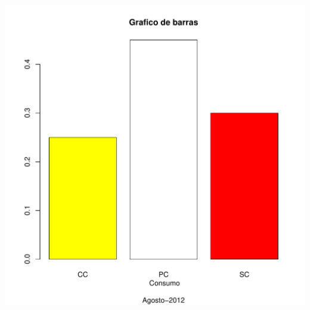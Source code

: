 \documentclass[12pt,letterpaper]{article}\usepackage[]{graphicx}\usepackage[]{color}
\makeatletter
\def\maxwidth{ %
  \ifdim\Gin@nat@width>\linewidth
    \linewidth
  \else
    \Gin@nat@width
  \fi
}
\newenvironment{knitrout}{}{} %
\makeatother
\begin{document}
\begin{enumerate}
\begin{knitrout}
\includegraphics[width=\maxwidth]{figure/unnamed-chunk-12-2} 

\end{knitrout}


\end{enumerate}
\end{document}
